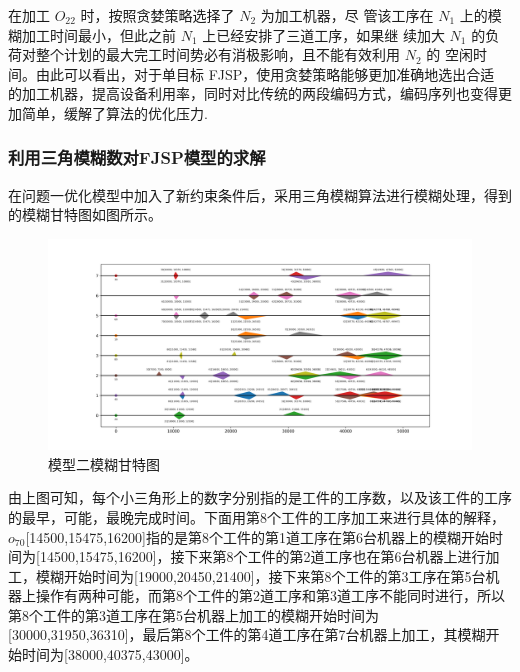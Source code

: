 \documentclass{whutmod}
\begin{document}
\begin{spacing}{1.2}
    

   
    
  
   在加工 $O_{22}$ 时，按照贪婪策略选择了 $N_2$ 为加工机器，尽 管该工序在 $N_1$ 上的模糊加工时间最小，但此之前 $N_1$ 上已经安排了三道工序，如果继 续加大 $N_1$ 的负荷对整个计划的最大完工时间势必有消极影响，且不能有效利用 $N_2$ 的 空闲时间。由此可以看出，对于单目标 FJSP，使用贪婪策略能够更加准确地选出合适 的加工机器，提高设备利用率，同时对比传统的两段编码方式，编码序列也变得更加简单，缓解了算法的优化压力.
    
   
    
   
    
 \subsubsection{利用三角模糊数对FJSP模型的求解}   
     在问题一优化模型中加入了新约束条件后，采用三角模糊算法进行模糊处理，得到的模糊甘特图如图所示。
    
    \begin{figure}[H]
    	\centering
    	\includegraphics[width=1.0\textwidth]{模糊甘特图.png}
    	\caption{模型二模糊甘特图}
    	
    \end{figure}

    由上图可知，每个小三角形上的数字分别指的是工件的工序数，以及该工件的工序的最早，可能，最晚完成时间。下面用第8个工件的工序加工来进行具体的解释，$o_{70}$[14500,15475,16200]指的是第8个工件的第1道工序在第6台机器上的模糊开始时间为[14500,15475,16200]，接下来第8个工件的第2道工序也在第6台机器上进行加工，模糊开始时间为[19000,20450,21400]，接下来第8个工件的第3工序在第5台机器上操作有两种可能，而第8个工件的第2道工序和第3道工序不能同时进行，所以第8个工件的第3道工序在第5台机器上加工的模糊开始时间为[30000,31950,36310]，最后第8个工件的第4道工序在第7台机器上加工，其模糊开始时间为[38000,40375,43000]。
    

\end{spacing}
\end{document}
